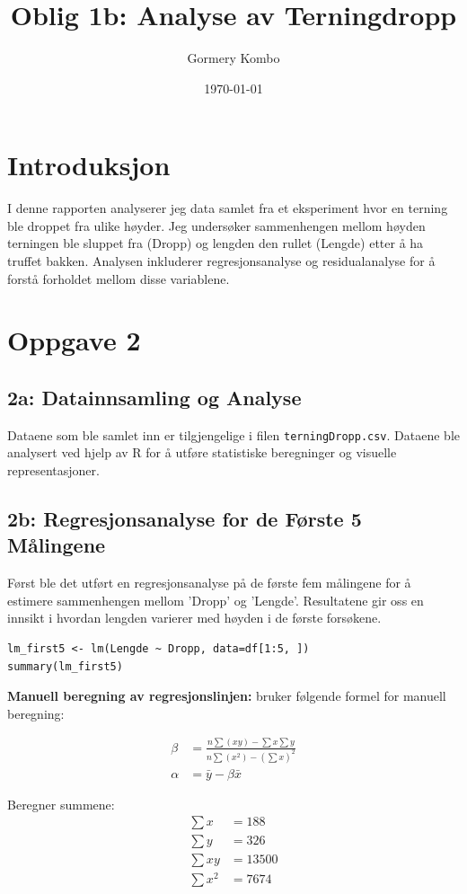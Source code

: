 \documentclass{article}
\title{Oblig 1b: Analyse av Terningdropp}
\author{Gormery Kombo}
\date{\today}
\begin{document}
\maketitle

\section{Introduksjon}
I denne rapporten analyserer jeg data samlet fra et eksperiment hvor en terning ble droppet fra ulike høyder. Jeg undersøker sammenhengen mellom høyden terningen ble sluppet fra (Dropp) og lengden den rullet (Lengde) etter å ha truffet bakken. Analysen inkluderer regresjonsanalyse og residualanalyse for å forstå forholdet mellom disse variablene.

\section{Oppgave 2}
\subsection{2a: Datainnsamling og Analyse}
Dataene som ble samlet inn er tilgjengelige i filen \texttt{terningDropp.csv}. Dataene ble analysert ved hjelp av R for å utføre statistiske beregninger og visuelle representasjoner.

\subsection{2b: Regresjonsanalyse for de Første 5 Målingene}
Først ble det utført en regresjonsanalyse på de første fem målingene for å estimere sammenhengen mellom 'Dropp' og 'Lengde'. Resultatene gir oss en innsikt i hvordan lengden varierer med høyden i de første forsøkene.

\begin{lstlisting}[style=Rstyle]
lm_first5 <- lm(Lengde ~ Dropp, data=df[1:5, ])
summary(lm_first5)
\end{lstlisting}
\textbf{Manuell beregning av regresjonslinjen:} 
bruker følgende formel for manuell beregning:

\begin{align*}
\beta &= \frac{n\sum(xy) - \sum x \sum y}{n\sum(x^2) - (\sum x)^2} \\
\alpha &= \bar{y} - \beta\bar{x}
\end{align*}

Beregner summene:
\begin{align*}
\sum x &= 188 \\
\sum y &= 326 \\
\sum xy &= 13500 \\
\sum x^2 &= 7674
\end{align*}
\end{document}
